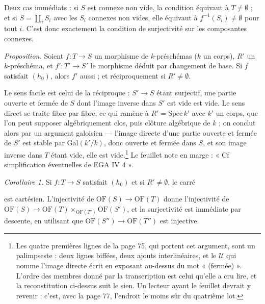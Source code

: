 \documentclass[11pt,a4paper]{article}
\begin{document}
Deux cas immédiats : si $S$ est connexe non vide, la condition équivaut à $T
\neq \emptyset$ ; et si $S = \coprod_{i} S_{i}$ avec les $S_{i}$ connexes non
vides, elle équivaut à $f^{-1}(S_{i}) \neq \emptyset$ pour tout $i$. C'est donc
exactement la condition de surjectivité sur les composantes connexes.

\emph{Proposition.} Soient $f : T \to S$ un morphisme de $k$-préschémas ($k$ un
corps), $R'$ un $k$-préschéma, et $f' : T' \to S'$ le morphisme déduit par
changement de base. Si $f$ satisfait $(h_{0})$, alors $f'$ aussi ; et
réciproquement si $R' \neq \emptyset$.

Le sens facile est celui de la réciproque : $S' \to S$ étant surjectif, une
partie ouverte et fermée de $S$ dont l'image inverse dans $S'$ est vide est
vide. Le sens direct se traite fibre par fibre, ce qui ramène à $R' =
\mathrm{Spec}\,k'$ avec $k'$ un corps, que l'on peut supposer algébriquement
clos, puis clôture algébrique de $k$ ; on conclut alors par un argument galoisien
— l'image directe d'une partie ouverte et fermée de $S'$ est stable par
$\mathrm{Gal}(k'/k)$, donc ouverte et fermée dans $S$, et son image inverse dans
$T$ étant vide, elle est vide.\footnote{Les quatre premières lignes de la page
75, qui portent cet argument, sont un palimpseste : deux lignes biffées, deux
ajouts interlinéaires, et le $\mathcal{U}$ qui nomme l'image directe écrit en
exposant au-dessus du mot « (fermée) ». L'ordre des membres donné par la
transcription est celui qu'elle a cru lire, et la reconstitution ci-dessus suit
le sien. Un lecteur ayant le feuillet devrait y revenir : c'est, avec la page
77, l'endroit le moins sûr du quatrième lot.} Le feuillet note en marge :
« Cf simplification éventuelles de EGA IV 4 ».

\emph{Corollaire 1.} Si $f : T \to S$ satisfait $(h_{0})$ et si $R' \neq
\emptyset$, le carré


est cartésien. L'injectivité de $\mathrm{OF}(S) \to \mathrm{OF}(T)$ donne
l'injectivité de $\mathrm{OF}(S) \to \mathrm{OF}(T) \times_{\mathrm{OF}(T')}
\mathrm{OF}(S')$, et la surjectivité est immédiate par descente, en utilisant
que $\mathrm{OF}(S'') \to \mathrm{OF}(T'')$ est injective.
\end{document}
